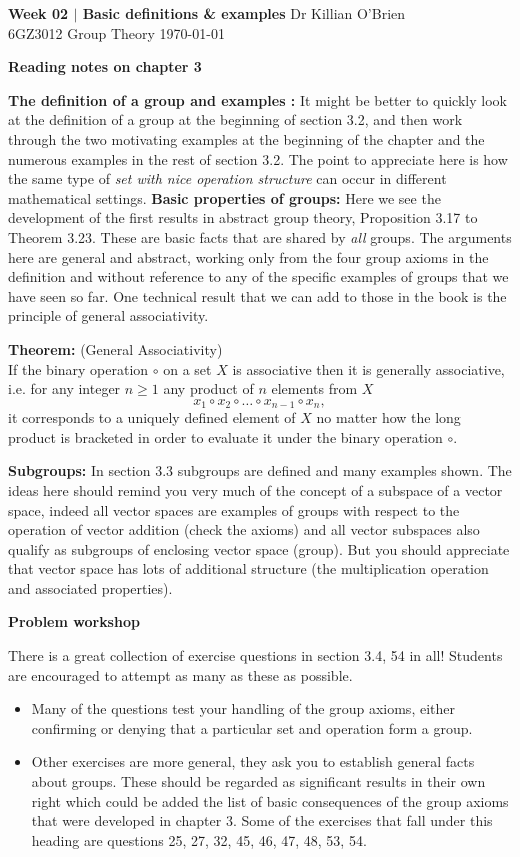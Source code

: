 \documentclass[oneside,10pt]{amsart}
\newcommand{\cbox}[1]{\begin{tcolorbox}[left=0.5mm,right=0.5mm,top=0.5mm,bottom=0.5mm, boxsep=2pt, boxrule=0pt,colback=black]\color{white}\sffamily #1 \end{tcolorbox}}
\newcommand{\tuttitle}[4]{\cbox{\textbf{#1} \hfill {#2}\\{#3} \hfill {\Small #4}}\vskip 4pt}
\newcommand{\topic}[1]{\cbox{\textbf{#1}}\vskip 4pt}
\begin{document}
\tuttitle{Week 02 $|$ Basic definitions \& examples}{Dr Killian O'Brien}{6GZ3012 Group Theory}{\today}
\vskip 16pt

\topic{Reading notes on chapter 3}

\textbf{The definition of a group and examples :}
It might be better to quickly look at the definition of a group at the beginning of section 3.2, and then work through the two motivating examples at the beginning of the chapter and the numerous examples in the rest of section 3.2. The point to appreciate here is how the same type of \emph{set with nice operation structure} can occur in different mathematical settings.
\vskip 8pt
\textbf{Basic properties of groups:} Here we see the development of the first results in abstract group theory, Proposition 3.17 to Theorem 3.23. These are basic facts that are shared by \emph{all} groups. The arguments here are general and abstract, working only from the four group axioms in the definition and without reference to any of the specific examples of groups that we have seen so far.
\vskip 8pt
One technical result that we can add to those in the book is the principle of general associativity.
\vskip 4pt
\begin{tcolorbox}[colback=black!15]
\textbf{Theorem:} (General Associativity)\\
If the binary operation $\circ$ on a set $X$ is associative then it is generally associative, i.e. for any integer $n \geq 1$ any product of $n$ elements from $X$
$$ x_1 \circ x_2 \circ \dots \circ x_{n-1} \circ x_n,$$
it corresponds to a uniquely defined element of $X$ no matter how the long product is bracketed in order to evaluate it under the binary operation $\circ$.
\end{tcolorbox}

\vskip 8pt
\textbf{Subgroups:}
In section 3.3 subgroups are defined and many examples shown. The ideas here should remind you very much of the concept of a subspace of a vector space, indeed all vector spaces are examples of groups with respect to the operation of vector addition (check the axioms) and all vector subspaces also qualify as subgroups of enclosing vector space (group). But you should appreciate that vector space has lots of additional structure (the multiplication operation and associated properties).

\vskip 8pt


\topic{Problem workshop}
There is a great collection of exercise questions in section 3.4, 54 in all! Students are encouraged to attempt as many as these as possible.

\begin{itemize}
\item
Many of the questions test your handling of the group axioms, either confirming or denying that a particular set and operation form a group.
\item
Other exercises are more general, they ask you to establish general facts about groups. These should be regarded as significant results in their own right which could be added the list of basic consequences of the group axioms that were developed in chapter 3. Some of the exercises that fall under this heading are questions 25, 27, 32, 45, 46, 47, 48, 53, 54.
\end{itemize}
\end{document}
